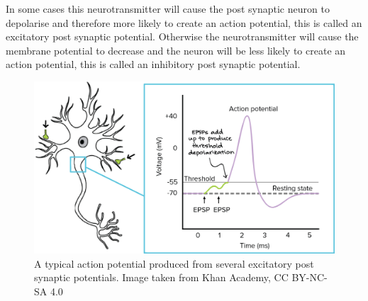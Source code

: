 \documentclass{epsrc}
\begin{document}
\noindent
In some cases this neurotransmitter will cause the post synaptic neuron to depolarise and therefore more likely to create an action potential, this is called an excitatory post synaptic potential. Otherwise the neurotransmitter will cause the membrane potential to decrease and the neuron will be less likely to create an action potential, this is called an inhibitory post synaptic potential.\\

\begin{figure}[ht]
  \includegraphics[width=0.7\linewidth]{img/Action_potential.png}
  \caption{A typical action potential produced from several excitatory post synaptic potentials. Image taken from Khan Academy, CC BY-NC-SA 4.0 }
  \label{fig:synapse}
\end{figure}
\end{document}
